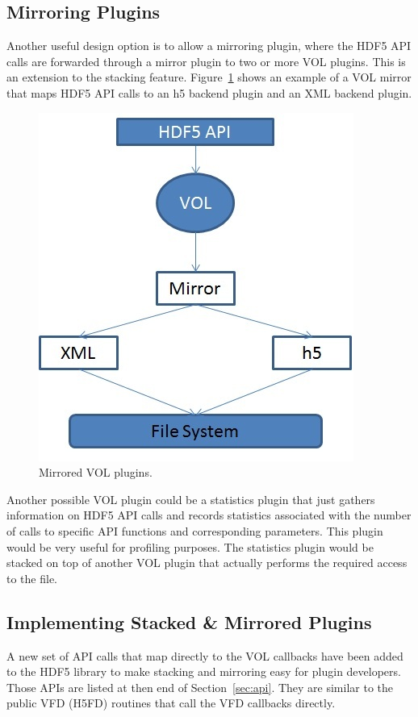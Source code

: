 \subsection{Mirroring Plugins}
Another useful design option is to allow a mirroring plugin, where the
HDF5 API calls are forwarded through a mirror plugin to two or more
VOL plugins. This is an extension to the stacking
feature. Figure~\ref{fig:mirror} shows an example of a VOL mirror that
maps HDF5 API calls to an h5 backend plugin and an XML backend plugin.

\begin{figure}[ht!]
\centering
\includegraphics[scale=0.75]{mirrored.jpg}
\caption{Mirrored VOL plugins.}
\label{fig:mirror}
\end{figure}

Another possible VOL plugin could be a statistics plugin that just
gathers information on HDF5 API calls and records statistics
associated with the number of calls to specific API functions and
corresponding parameters. This plugin would be very useful for
profiling purposes. The statistics plugin would be stacked on top of
another VOL plugin that actually performs the required access to the
file.

\subsection{Implementing Stacked \& Mirrored Plugins}
A new set of API calls that map directly to the VOL callbacks have
been added to the HDF5 library to make stacking and mirroring easy for
plugin developers. Those APIs are listed at then end of Section~\ref{sec:api}. They are similar to the public VFD (H5FD) routines that call the VFD callbacks directly.

